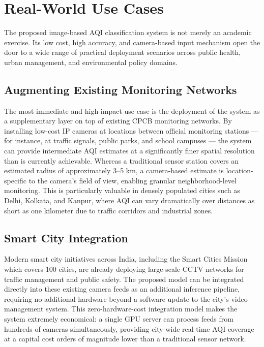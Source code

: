 \documentclass[conference]{IEEEtran}
\begin{document}
\section{Real-World Use Cases}

The proposed image-based AQI classification system is not merely an academic
exercise. Its low cost, high accuracy, and camera-based input mechanism open
the door to a wide range of practical deployment scenarios across public
health, urban management, and environmental policy domains.

\subsection{Augmenting Existing Monitoring Networks}

The most immediate and high-impact use case is the deployment of the system
as a supplementary layer on top of existing CPCB monitoring networks. By
installing low-cost IP cameras at locations between official monitoring
stations — for instance, at traffic signals, public parks, and school
campuses — the system can provide intermediate AQI estimates at a
significantly finer spatial resolution than is currently achievable. Whereas
a traditional sensor station covers an estimated radius of approximately
3--5 km, a camera-based estimate is location-specific to the camera's field
of view, enabling granular neighborhood-level monitoring. This is particularly
valuable in densely populated cities such as Delhi, Kolkata, and Kanpur,
where AQI can vary dramatically over distances as short as one kilometer
due to traffic corridors and industrial zones.

\subsection{Smart City Integration}

Modern smart city initiatives across India, including the Smart Cities Mission
which covers 100 cities, are already deploying large-scale CCTV networks for
traffic management and public safety. The proposed model can be integrated
directly into these existing camera feeds as an additional inference pipeline,
requiring no additional hardware beyond a software update to the city's video
management system. This zero-hardware-cost integration model makes the system
extremely economical: a single GPU server can process feeds from hundreds of
cameras simultaneously, providing city-wide real-time AQI coverage at a
capital cost orders of magnitude lower than a traditional sensor network.
\end{document}
